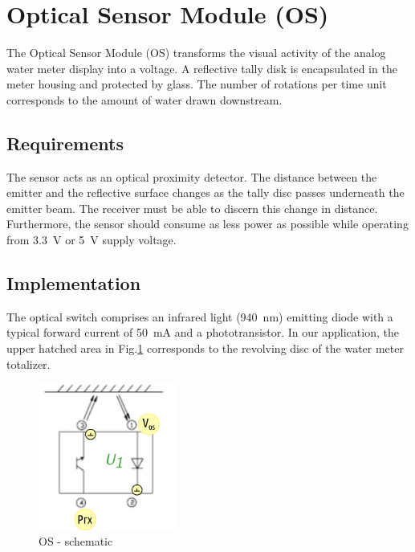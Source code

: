 \section{Optical Sensor Module (OS)}

The Optical Sensor Module (OS) transforms the visual activity of the analog water meter display into
a voltage. A reflective tally disk is encapsulated in the meter housing and protected by glass.
The number of rotations per
time unit corresponds to the amount of water drawn downstream.

\subsection{Requirements}

The sensor acts as an optical proximity detector. The distance between the emitter and the reflective surface
changes as the tally disc passes underneath the emitter beam.
The receiver must be able to discern this change in distance.
Furthermore, the sensor should consume as less power as possible while operating from \SI{3.3}{\volt} or
\SI{5}{\volt} supply voltage.

\subsection{Implementation}

The optical switch comprises an infrared light (\SI{940}{\nano\meter}) emitting diode with a typical forward
current of \SI{50}{\mA} and a phototransistor. In our application, the upper hatched area in
Fig.\ref{fig:osos} corresponds to the
revolving disc of the water meter totalizer.

\begin{figure}[h]
    \centering
    \includegraphics[width=0.4\textwidth]{OS/OS}
    \caption{OS - schematic}
    \label{fig:osos}
\end{figure}



